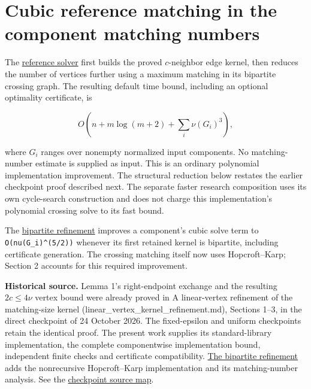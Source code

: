 
\hypertarget{af-e51d4b9b02-cubic-reference-matching-in-the-component-matching-numbers}{%
\section{Cubic reference matching in the component matching numbers}\label{af-e51d4b9b02-cubic-reference-matching-in-the-component-matching-numbers}}

The \href{https://github.com/icekylinx/algorithm-frontier/blob/main/problems/general-matching/reference/matching.py}{reference solver} first builds the proved \(c\)-neighbor edge kernel, then reduces the number of vertices further using a maximum matching in its bipartite crossing graph. The resulting default time bound, including an optional optimality certificate, is

\[
O\!\left(n+m\log(m+2)+\sum_i \nu(G_i)^3\right),
\]

where \(G_i\) ranges over nonempty normalized input components. No matching-number estimate is supplied as input. This is an ordinary polynomial implementation improvement. The structural reduction below restates the earlier checkpoint proof described next. The separate faster research composition uses its own cycle-search construction and does not charge this implementation's polynomial crossing solve to its fast bound.

The \href{https://github.com/icekylinx/algorithm-frontier/blob/main/problems/general-matching/reference/bipartite-proof.md}{bipartite refinement} improves a component's cubic solve term to \texttt{O(nu(G\_i)\^{}(5/2))} whenever its first retained kernel is bipartite, including certificate generation. The crossing matching itself now uses Hopcroft--Karp; Section 2 accounts for this required improvement.

\textbf{Historical source.} Lemma 1's right-endpoint exchange and the resulting \(2c\leq4\nu\) vertex bound were already proved in A linear-vertex refinement of the matching-size kernel (linear\_vertex\_kernel\_refinement.md), Sections 1--3, in the direct checkpoint of 24 October 2026. The fixed-epsilon and uniform checkpoints retain the identical proof. The present work supplies its standard-library implementation, the complete componentwise implementation bound, independent finite checks and certificate compatibility. \href{https://github.com/icekylinx/algorithm-frontier/blob/main/problems/general-matching/reference/bipartite-proof.md}{The bipartite refinement} adds the nonrecursive Hopcroft--Karp implementation and its matching-number analysis. See the \href{https://github.com/icekylinx/algorithm-frontier/blob/main/problems/general-matching/sources.md\#checkpoint-provenance}{checkpoint source map}.

